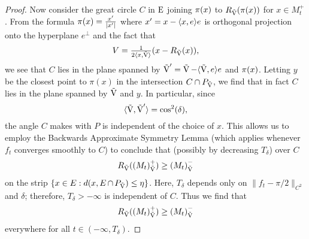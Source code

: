 \documentclass{amsart}
\theoremstyle{definition}
\theoremstyle{remark}
\numberwithin{equation}{section}
\begin{document}
\begin{proof}
Now consider the great circle \(C\) in \(\operatorname{E}\) joining \(\operatorname{\pi}(x)\) to \(R_{\operatorname{\vec{V}}}(\operatorname{\pi}(x))\) for \(x \in M_t^+\). From the formula \(\operatorname{\pi}(x) = \tfrac{x'}{|x'|}\) where \(x' = x - \langle{x},{e}\rangle e\) is orthogonal projection onto the hyperplane \(e^{\perp}\) and the fact that
\[
V = \tfrac{1}{2\langle{x},{\operatorname{\vec{V}}}\rangle}(x - R_{\operatorname{\vec{V}}}(x)),
\]
we see that \(C\) lies in the plane spanned by \(\operatorname{\vec{V}}' = \operatorname{\vec{V}} - \langle{\operatorname{\vec{V}}},{e}\rangle e\) and \(\operatorname{\pi}(x)\). Letting \(y\) be the closest point to $\pi(x)$ in the intersection \( C \cap P_{\operatorname{\vec{V}}}\), we find that in fact \(C\) lies in the plane spanned by \(\operatorname{\vec{V}}\) and \(y\). In particular, since
\[
\langle{\operatorname{\vec{V}}},{\operatorname{\vec{V}}'}\rangle = \cos^2(\delta),
\]
the angle \(C\) makes with \(P\) is independent of the choice of \(x\). This allows us to employ the Backwards Approximate Symmetry Lemma \cite[Lemma 5.1]{Br-Lou} (which applies whenever \(f_t\) converges smoothly to \(C\)) to conclude that (possibly by decreasing \(T_{\delta}\)) over \(C\)
\[
R_{\operatorname{\vec{V}}}({(M_t)}_{\operatorname{\vec{V}}}^+) \geq {(M_t)}_{\operatorname{\vec{V}}}^-
\]
on the strip \(\{x \in E: d(x, E \operatorname{\cap} P_{\operatorname{\vec{V}}}) \leq \eta\}\). Here, \(T_{\delta}\) depends only on \(\|f_t - \pi/2\|_{C^{2}}\) and \(\delta\); therefore, \(T_{\delta} > - \infty\) is independent of \(C\). Thus we find that
\begin{equation}
\label{eq:backwards_approximate_symmetry}
R_{\operatorname{\vec{V}}}({(M_t)}_{\operatorname{\vec{V}}}^+) \geq {(M_t)}_{\operatorname{\vec{V}}}^-
\end{equation}
everywhere for all \(t \in (-\infty, T_{\delta})\).


\end{proof}
\end{document}
